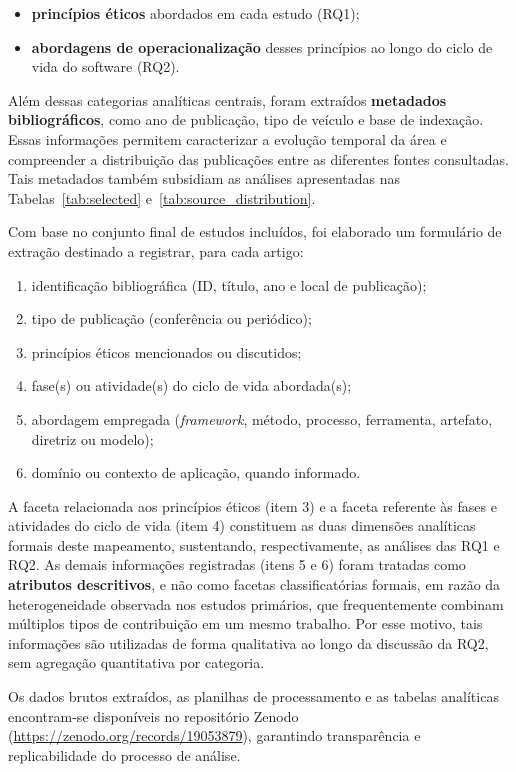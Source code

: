 \begin{itemize}
    \item \textbf{princípios éticos} abordados em cada estudo (RQ1);
    \item \textbf{abordagens de operacionalização} desses princípios ao longo do ciclo de vida do software (RQ2).
\end{itemize}

Além dessas categorias analíticas centrais, foram extraídos \textbf{metadados bibliográficos}, como ano de publicação, tipo de veículo e base de indexação. Essas informações permitem caracterizar a evolução temporal da área e compreender a distribuição das publicações entre as diferentes fontes consultadas. Tais metadados também subsidiam as análises apresentadas nas Tabelas~\ref{tab:selected} e~\ref{tab:source_distribution}.

Com base no conjunto final de estudos incluídos, foi elaborado um formulário de extração destinado a registrar, para cada artigo:

\begin{enumerate}
    \item identificação bibliográfica (ID, título, ano e local de publicação);
    \item tipo de publicação (conferência ou periódico);
    \item princípios éticos mencionados ou discutidos;
    \item fase(s) ou atividade(s) do ciclo de vida abordada(s);
    \item abordagem empregada (\textit{framework}, método, processo, ferramenta, artefato, diretriz ou modelo);
    \item domínio ou contexto de aplicação, quando informado.
\end{enumerate}

A faceta relacionada aos princípios éticos (item 3) e a faceta referente às fases e atividades do ciclo de vida (item 4) constituem as duas dimensões analíticas formais deste mapeamento, sustentando, respectivamente, as análises das RQ1 e RQ2. As demais informações registradas (itens 5 e 6) foram tratadas como \textbf{atributos descritivos}, e não como facetas classificatórias formais, em razão da heterogeneidade observada nos estudos primários, que frequentemente combinam múltiplos tipos de contribuição em um mesmo trabalho. Por esse motivo, tais informações são utilizadas de forma qualitativa ao longo da discussão da RQ2, sem agregação quantitativa por categoria.

Os dados brutos extraídos, as planilhas de processamento e as tabelas analíticas encontram-se disponíveis no repositório Zenodo (\url{https://zenodo.org/records/19053879}), garantindo transparência e replicabilidade do processo de análise.

